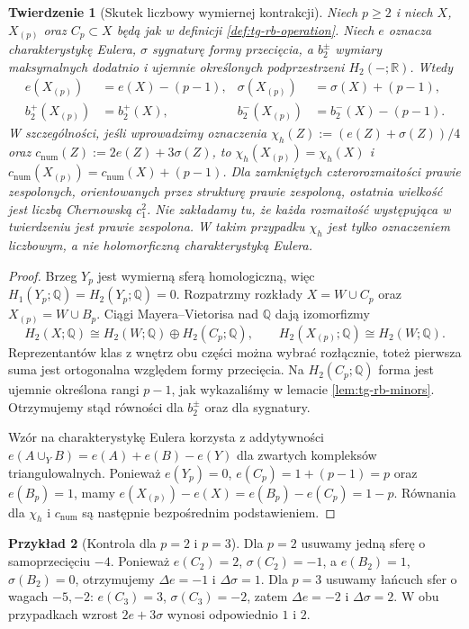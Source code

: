 \documentclass[11pt,a4paper]{report}
\numberwithin{equation}{section}
\theoremstyle{plain}
\newtheorem{twierdzenie}{Twierdzenie}[section]
\theoremstyle{definition}
\newtheorem{przyklad}[twierdzenie]{Przykład}
\theoremstyle{remark}
\begin{document}
\begin{twierdzenie}[Skutek liczbowy wymiernej kontrakcji]
\label{thm:tg-rb-invariants}
Niech $p\geq2$ i niech $X$, $X_{(p)}$ oraz
$C_p\subset X$ będą jak w definicji
\ref{def:tg-rb-operation}.
Niech $e$ oznacza charakterystykę Eulera,
$\sigma$ sygnaturę formy przecięcia, a
$b_2^\pm$ wymiary maksymalnych dodatnio i
ujemnie określonych podprzestrzeni
$H_2(-;\mathbb R)$.
Wtedy
\[
\begin{aligned}
e(X_{(p)})&=e(X)-(p-1), &
\sigma(X_{(p)})&=\sigma(X)+(p-1),\\
b_2^+(X_{(p)})&=b_2^+(X), &
b_2^-(X_{(p)})&=b_2^-(X)-(p-1).
\end{aligned}
\]
W szczególności, jeśli wprowadzimy oznaczenia
$\chi_h(Z):=(e(Z)+\sigma(Z))/4$ oraz
$c_{\mathrm{num}}(Z):=2e(Z)+3\sigma(Z)$,
to $\chi_h(X_{(p)})=\chi_h(X)$ i
$c_{\mathrm{num}}(X_{(p)})=c_{\mathrm{num}}(X)+(p-1)$.
Dla zamkniętych czterorozmaitości prawie zespolonych,
orientowanych przez strukturę prawie zespoloną,
ostatnia wielkość jest liczbą Chernowską $c_1^2$.
Nie zakładamy tu, że każda rozmaitość występująca
w twierdzeniu jest prawie zespolona. W takim przypadku
$\chi_h$ jest tylko oznaczeniem liczbowym, a nie holomorficzną
charakterystyką Eulera.
\end{twierdzenie}

\begin{proof}
Brzeg $Y_p$ jest wymierną sferą homologiczną,
więc $H_1(Y_p;\mathbb Q)=H_2(Y_p;\mathbb Q)=0$.
Rozpatrzmy rozkłady $X=W\cup C_p$ oraz
$X_{(p)}=W\cup B_p$. Ciągi Mayera--Vietorisa
nad $\mathbb Q$ dają izomorfizmy
\[
H_2(X;\mathbb Q)\cong H_2(W;\mathbb Q)
\oplus H_2(C_p;\mathbb Q),\qquad
H_2(X_{(p)};\mathbb Q)\cong H_2(W;\mathbb Q).
\]
Reprezentantów klas z wnętrz obu części można
wybrać rozłącznie, toteż pierwsza suma jest
ortogonalna względem formy przecięcia.
Na $H_2(C_p;\mathbb Q)$ forma jest ujemnie określona
rangi $p-1$, jak wykazaliśmy w lemacie
\ref{lem:tg-rb-minors}. Otrzymujemy stąd równości
dla $b_2^\pm$ oraz dla sygnatury.

Wzór na charakterystykę Eulera korzysta z addytywności
$e(A\cup_YB)=e(A)+e(B)-e(Y)$ dla zwartych
kompleksów triangulowalnych. Ponieważ
$e(Y_p)=0$, $e(C_p)=1+(p-1)=p$ oraz
$e(B_p)=1$, mamy
$e(X_{(p)})-e(X)=e(B_p)-e(C_p)=1-p$.
Równania dla $\chi_h$ i $c_{\mathrm{num}}$ są
następnie bezpośrednim podstawieniem.
\end{proof}

\begin{przyklad}[Kontrola dla $p=2$ i $p=3$]
Dla $p=2$ usuwamy jedną sferę o samoprzecięciu
$-4$. Ponieważ $e(C_2)=2$, $\sigma(C_2)=-1$,
a $e(B_2)=1$, $\sigma(B_2)=0$, otrzymujemy
$\Delta e=-1$ i $\Delta\sigma=1$.
Dla $p=3$ usuwamy łańcuch sfer o wagach $-5,-2$:
$e(C_3)=3$, $\sigma(C_3)=-2$, zatem
$\Delta e=-2$ i $\Delta\sigma=2$.
W obu przypadkach wzrost $2e+3\sigma$ wynosi
odpowiednio $1$ i $2$.
\end{przyklad}
\end{document}
